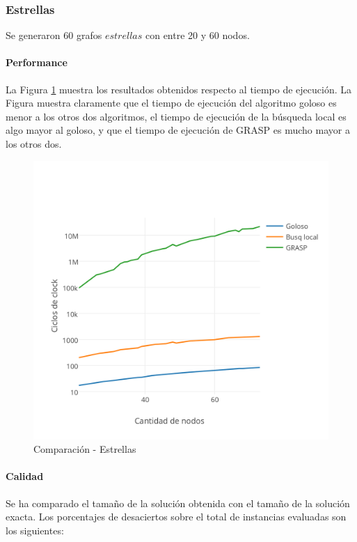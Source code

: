 \subsubsection{Estrellas}

Se generaron 60 grafos $estrellas$ con entre 20 y 60 nodos.

\paragraph{Performance}

La Figura \ref{fig:5B} muestra los resultados obtenidos respecto al tiempo de ejecución. La Figura muestra claramente que el tiempo de ejecución del algoritmo goloso es menor a los otros dos algoritmos, el tiempo de ejecución de la búsqueda local es algo mayor al goloso, y que el tiempo de ejecución de GRASP es mucho mayor a los otros dos.

\begin{figure}[htb]
	\begin{center}
    		\includegraphics[scale=0.8]{imagenes/final-estrellas.png}
	\end{center}
	\caption{Comparación - Estrellas}\label{fig:5B}
\end{figure}

\paragraph{Calidad} Se ha comparado el tamaño de la solución obtenida con el tamaño de la solución exacta. Los porcentajes de desaciertos sobre el total de instancias evaluadas son los siguientes:

